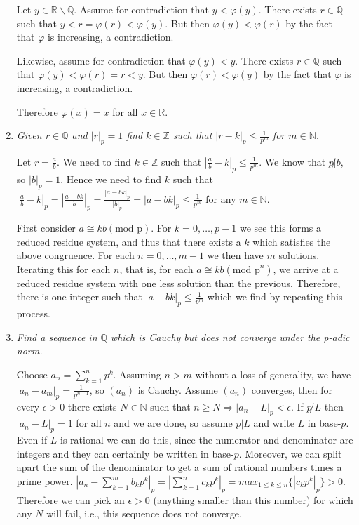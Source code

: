 \documentclass[10pt]{article}
\begin{document}
\begin{enumerate}
Let $y \in \mathbb{R} \backslash \mathbb{Q}$.  Assume for contradiction that $y<\varphi(y)$.  There exists $r \in \mathbb{Q}$ such that $y<r=\varphi(r)<\varphi(y)$.  But then $\varphi(y)<\varphi(r)$ by the fact that $\varphi$ is increasing, a contradiction.

Likewise, assume for contradiction that $\varphi(y)<y$.  There exists $r \in \mathbb{Q}$ such that $\varphi(y)<\varphi(r)=r<y$.  But then $\varphi(r)<\varphi(y)$ by the fact that $\varphi$ is increasing, a contradiction.

Therefore $\varphi(x)=x$ for all $x \in \mathbb{R}$. 
\item \emph{Given $r \in \mathbb{Q}$ and $|r|_p = 1$ find $k \in \mathbb{Z}$ such that $|r-k|_p \leq \frac{1}{p^m}$ for $m \in \mathbb{N}$.}

Let $r=\frac{a}{b}$.  We need to find $k \in \mathbb{Z}$ such that $|\frac{a}{b}-k|_p \leq \frac{1}{p^m}$.  We know that $p \not| b$, so $|b|_p=1$.  Hence we need to find $k$ such that $|\frac{a}{b}-k|_p = |\frac{a-bk}{b}|_p = \frac{|a-bk|_p}{|b|_p} = |a-bk|_p \leq \frac{1}{p^m}$ for any $m \in \mathbb{N}$.

First consider $a \cong kb (\mbox{mod p})$.  For $k=0,\ldots,p-1$ we see this forms a reduced residue system, and thus that there exists a $k$ which satisfies the above congruence.  For each $n=0,\ldots,m-1$ we then have $m$ solutions.  Iterating this for each $n$, that is, for each $a \cong kb (\mbox{mod p}^n)$, we arrive at a reduced residue system with one less solution than the previous.  Therefore, there is one integer such that $|a-bk|_p \leq \frac{1}{p^m}$ which we find by repeating this process.

\item \emph{Find a sequence in $\mathbb{Q}$ which is Cauchy but does not converge under the p-adic norm.}

Choose $a_n = \sum_{k=1}^{n}p^k$.  Assuming $n>m$ without a loss of generality, we have $|a_n - a_m|_p = \frac{1}{p^{n+1}}$, so $(a_n)$ is Cauchy.  Assume $(a_n)$ converges, then for every $\epsilon>0$ there exists $N \in \mathbb{N}$ such that $n \geq N \Rightarrow |a_n-L|_p < \epsilon$. If $p \not| L$ then $|a_n-L|_p = 1$ for all $n$ and we are done, so assume $p|L$ and write $L$ in base-$p$.  Even if $L$ is rational we can do this, since the numerator and denominator are integers and they can certainly be written in base-$p$.  Moreover, we can split apart the sum of the denominator to get a sum of rational numbers times a prime power.  $|a_n - \sum_{k=1}^mb_kp^k|_p = |\sum_{k=1}^nc_kp^k|_p = max_{1 \leq k \leq n}\{|c_kp^k|_p\} > 0$.  Therefore we can pick an $\epsilon >0$ (anything smaller than this number) for which any $N$ will fail, i.e., this sequence does not converge.



\end{enumerate}
\end{document}
